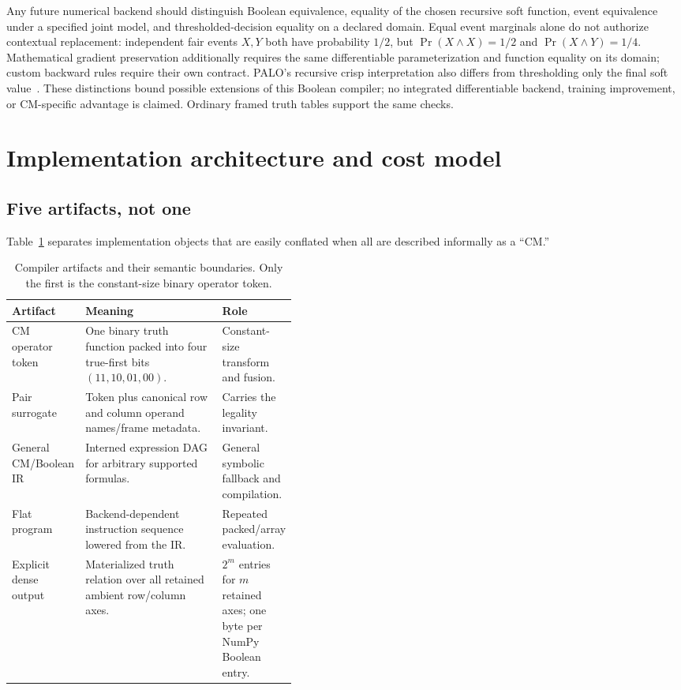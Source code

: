 \documentclass[10pt]{article}
\theoremstyle{plain}
\theoremstyle{definition}
\theoremstyle{remark}
\begin{document}
Any future numerical backend should distinguish Boolean equivalence, equality of the chosen recursive soft function, event equivalence under a specified joint model, and thresholded-decision equality on a declared domain. Equal event marginals alone do not authorize contextual replacement: independent fair events $X,Y$ both have probability $1/2$, but $\Pr(X\land X)=1/2$ and $\Pr(X\land Y)=1/4$. Mathematical gradient preservation additionally requires the same differentiable parameterization and function equality on its domain; custom backward rules require their own contract. PALO's recursive crisp interpretation also differs from thresholding only the final soft value~\cite[Section~3.7]{Stehr2022}. These distinctions bound possible extensions of this Boolean compiler; no integrated differentiable backend, training improvement, or CM-specific advantage is claimed. Ordinary framed truth tables support the same checks.

\section{Implementation architecture and cost model}
\label{sec:implementation}

\subsection{Five artifacts, not one}

Table~\ref{tab:artifacts} separates implementation objects that are easily conflated when all are described informally as a ``CM.''

\begin{table}[t]
\centering
\small
\begin{tabularx}{\linewidth}{@{}>{\raggedright\arraybackslash}p{0.18\linewidth}>{\raggedright\arraybackslash}X >{\raggedright\arraybackslash}p{0.24\linewidth}@{}}
\toprule
\textbf{Artifact} & \textbf{Meaning} & \textbf{Role}\\
\midrule
CM operator token & One binary truth function packed into four true-first bits $(11,10,01,00)$. & Constant-size transform and fusion.\\
Pair surrogate & Token plus canonical row and column operand names/frame metadata. & Carries the legality invariant.\\
General CM/Boolean IR & Interned expression DAG for arbitrary supported formulas. & General symbolic fallback and compilation.\\
Flat program & Backend-dependent instruction sequence lowered from the IR. & Repeated packed/array evaluation.\\
Explicit dense output & Materialized truth relation over all retained ambient row/column axes. & $2^m$ entries for $m$ retained axes; one byte per NumPy Boolean entry.\\
\bottomrule
\end{tabularx}
\caption{Compiler artifacts and their semantic boundaries. Only the first is the constant-size binary operator token.}
\label{tab:artifacts}
\end{table}
\end{document}
